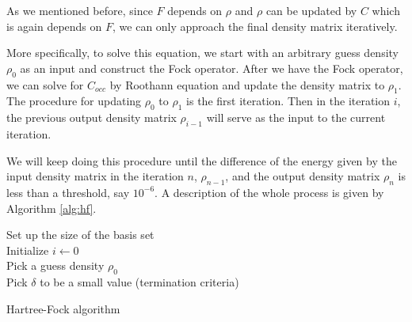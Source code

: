 \documentclass[twoside]{article}
\begin{document}


As we mentioned before, since $F$ depends on $\rho$ and $\rho$ can be updated by $C$ which is again depends on $F$, we can only approach the final density matrix iteratively.

More specifically, to solve this equation, we start with an arbitrary guess density $\rho_0$ as an input and construct the Fock operator. 
After we have the Fock operator, we can solve for $C_{occ}$ by Roothann equation and update the density matrix to $\rho_1$. The procedure for updating $\rho_0$ to $\rho_1$ is the first iteration. Then in the iteration $i$, the previous output density matrix $\rho_{i-1}$ will serve as the input to the current iteration.

We will keep doing this procedure until the difference of the energy given by the input density matrix in the iteration $n$, $\rho_{n-1}$,  and the output density matrix $\rho_n$ is less than a threshold, say $10^{-6}$.  A description of the whole process is given by Algorithm \ref{alg:hf}.





\begin{algorithm}[htb]
 \label{alg:hf}
	Set up the size of the basis set \\
	Initialize $i \leftarrow	 0$ \\	
	Pick a guess density $\rho_0$ \\
	Pick $\delta$ to be a small value (termination criteria) \\
 \caption{Hartree-Fock algorithm}
\end{algorithm}
\end{document}
